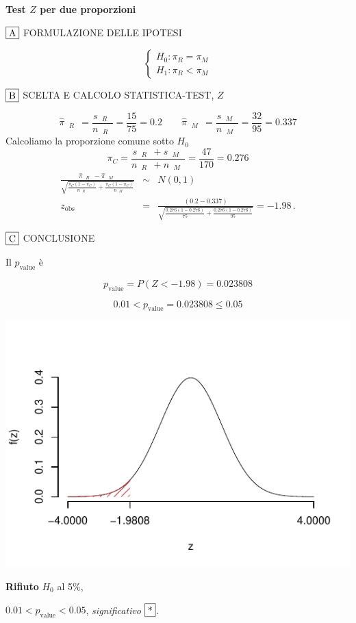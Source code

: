 \documentclass[
  11pt,
]{book}
\theoremstyle{mytheoremstyle}
\theoremstyle{mydefstyle}
\newenvironment{sol}
  {
  \begin{tcolorbox}[enhanced,breakable,arc=0.1mm,boxrule=1pt,colback=white,colframe=iblue,
  title=\bf \fontfamily{lmss}\selectfont \hspace{.5 cm} Soluzione,drop fuzzy shadow]

}{
\end{tcolorbox}
  }
\begin{document}
\begin{sol}
\textbf{Test \(Z\) per due proporzioni}

\(\fbox{A}\) FORMULAZIONE DELLE IPOTESI

\[\begin{cases}
   H_0: \pi_\text{$R$} = \pi_\text{$M$} \\
   H_1: \pi_\text{$R$} < \pi_\text{$M$} 
   \end{cases}\]

\(\fbox{B}\) SCELTA E CALCOLO STATISTICA-TEST, \(Z\)

\[\hat\pi_\text{ $R$ }=\frac{s_\text{ $R$ }}{n_\text{ $R$ }}=\frac{ 15 }{ 75 }= 0.2 \qquad
   \hat\pi_\text{ $M$ }=\frac{s_\text{ $M$ }}{n_\text{ $M$ }}=\frac{ 32 }{ 95 }= 0.337 \]Calcoliamo la proporzione comune sotto \(H_0\)
\[
     \pi_C=\frac{s_\text{ $R$ }+s_\text{ $M$ }}{n_\text{ $R$ }+n_\text{ $M$ }}=
     \frac{ 47 }{ 170 }= 0.276 
   \]\begin{eqnarray*}
   \frac{\hat\pi_\text{ $R$ } - \hat\pi_\text{ $M$ }}
   {\sqrt{\frac {\pi_C(1-\pi_C)}{n_\text{ $R$ }}+\frac {\pi_C(1-\pi_C)}{n_\text{ $M$ }}}}&\sim&N(0,1)\\
   z_{\text{obs}}
   &=& \frac{ ( 0.2 -  0.337 )} {\sqrt{\frac{ 0.276 (1- 0.276 )}{ 75 }+\frac{ 0.276 (1- 0.276 )}{ 95 }}}
   =   -1.98 \, .
   \end{eqnarray*}

\(\fbox{C}\) CONCLUSIONE

Il \(p_{\text{value}}\) è

\[ p_{\text{value}} = P(Z<-1.98)=0.023808 \]

\[
 0.01 < p_\text{value}= 0.023808 \leq 0.05 
\]

\begin{center}\includegraphics{Esami_passati_con_soluzioni_files/figure-latex/2022-108-1} \end{center}

\textbf{Rifiuto} \(H_0\) al 5\%,

\(0.01<p_\text{value}<0.05\), \emph{significativo} \(\fbox{*}\).

\end{sol}
\end{document}
